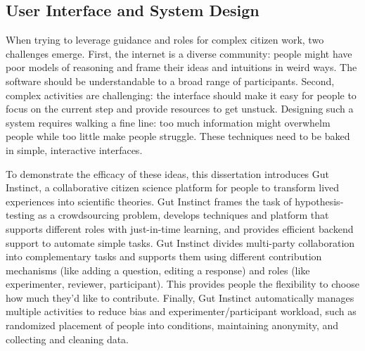 


\subsection{User Interface and System Design}

When trying to leverage guidance and roles for complex citizen work, two challenges emerge. First, the internet is a diverse community: people might have poor models of reasoning and frame their ideas and intuitions in weird ways. The software should be understandable to a broad range of participants. Second, complex activities are challenging: the interface should make it easy for people to focus on the current step and provide resources to get unstuck. Designing such a system requires walking a fine line: too much information might overwhelm people while too little make people struggle. These techniques need to be baked in simple, interactive interfaces.

To demonstrate the efficacy of these ideas, this dissertation introduces Gut Instinct, a collaborative citizen science platform for people to transform lived experiences into scientific theories. Gut Instinct frames the task of hypothesis-testing as a crowdsourcing problem, develops techniques and platform that supports different roles with just-in-time learning, and provides efficient backend support to automate simple tasks. Gut Instinct divides multi-party collaboration into complementary tasks and supports them using different contribution mechanisms (like adding a question, editing a response) and roles (like experimenter, reviewer, participant). This provides people the flexibility to choose how much they’d like to contribute. Finally, Gut Instinct automatically manages multiple activities to reduce 
bias and experimenter/participant workload, such as randomized placement of  people into conditions, maintaining anonymity, and collecting and cleaning data.

